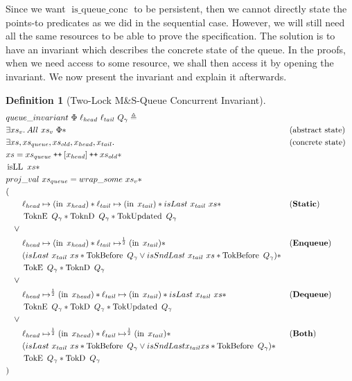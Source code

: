 \documentclass[a4paper, 11pt]{report}
\newtheorem{definition}{Definition}[section]
\newcommand{\tlmsq}{Two-Lock M\&S-Queue\xspace}
\newcommand{\isqueueconc}{\operatorname{is\_queue\_conc}}
\newcommand{\isLL}{\operatorname{isLL}}
\newcommand{\nIn}[1]{\operatorname{in} \; #1}
\newcommand{\StaticState}{\textbf{Static}}
\newcommand{\EnqueueState}{\textbf{Enqueue}}
\newcommand{\DequeueState}{\textbf{Dequeue}}
\newcommand{\BothState}{\textbf{Both}}
\newcommand{\Qg}{Q_\gname}
\newcommand{\TokE}[1]{\operatorname{TokE}\ #1}
\newcommand{\TokEQg}{\TokE{\Qg}}
\newcommand{\ToknE}[1]{\operatorname{ToknE}\ #1}
\newcommand{\ToknEQg}{\ToknE{\Qg}}
\newcommand{\TokD}[1]{\operatorname{TokD}\ #1}
\newcommand{\TokDQg}{\TokD{\Qg}}
\newcommand{\ToknD}[1]{\operatorname{ToknD}\ #1}
\newcommand{\ToknDQg}{\ToknD{\Qg}}
\newcommand{\TokBefore}[1]{\operatorname{TokBefore}\ #1}
\newcommand{\TokBeforeQg}{\TokBefore{\Qg}}
\newcommand{\TokAfterQg}{\TokBefore{\Qg}}
\newcommand{\TokUpdated}[1]{\operatorname{TokUpdated}\ #1}
\newcommand{\TokUpdatedQg}{\TokUpdated{\Qg}}
\newcommand\catenate{\mathbin{\text{\ttfamily\upshape ++}}}
\begin{document}
Since we want $\isqueueconc$ to be persistent, then we cannot directly state the points-to predicates as we did in the sequential case. However, we will still need all the same resources to be able to prove the specification. The solution is to have an invariant which describes the concrete state of the queue. In the proofs, when we need access to some resource, we shall then access it by opening the invariant. We now present the invariant and explain it afterwards.
\begin{definition}[\tlmsq Concurrent Invariant]\label{TLMSQ:spec:invariant}
  \begin{align*}
    &queue\_invariant \ \Phi \ \loc_{head} \ \loc_{tail} \ Q_\gname \eqdef\\
    &\Exists xs_v. All \ xs_v \ \Phi \star &&\text{(abstract state)}\\
    &\Exists xs, xs_{queue}, xs_{old}, x_{head}, x_{tail} . &&\text{(concrete state)}\\
    &xs = xs_{queue} \catenate [x_{head}] \catenate xs_{old} \star\\
    &\isLL \ xs \star\\
    &proj\_val \ xs_{queue} = wrap\_some \ xs_v \star\\
    &(\\
    &\quad\quad\loc_{head} \mapsto (\nIn{x_{head}}) \star \loc_{tail} \mapsto (\nIn{x_{tail}}) \star isLast \ x_{tail} \ xs \star &&\text{(\StaticState)}\\
    &\quad\quad \ToknEQg \star \ToknDQg \star \TokUpdatedQg\\
    &\quad\lor\\
    &\quad\quad\loc_{head} \mapsto (\nIn{x_{head}}) \star \loc_{tail} \mapsto^{\frac{1}{2}} (\nIn{x_{tail}}) \star &&\text{(\EnqueueState)}\\
    &\quad\quad (isLast \ x_{tail} \ xs \star \TokBeforeQg \lor isSndLast \ x_{tail} \ xs \star \TokAfterQg) \star\\
    &\quad\quad \TokEQg \star \ToknDQg\\
    &\quad\lor\\
    &\quad\quad\loc_{head} \mapsto^{\frac{1}{2}} (\nIn{x_{head}}) \star \loc_{tail} \mapsto (\nIn{x_{tail}}) \star isLast \ x_{tail} \ xs \star &&\text{(\DequeueState)}\\
    &\quad\quad \ToknEQg \star \TokDQg \star \TokUpdatedQg\\
    &\quad\lor\\
    &\quad\quad\loc_{head} \mapsto^{\frac{1}{2}} (\nIn{x_{head}}) \star \loc_{tail} \mapsto^{\frac{1}{2}} (\nIn{x_{tail}}) \star &&\text{(\BothState)}\\
    &\quad\quad (isLast \ x_{tail} \ xs \star \TokBeforeQg \lor isSndLast x_{tail} xs \star \TokAfterQg) \star\\
    &\quad\quad \TokEQg \star \TokDQg\\
    &)
  \end{align*}
\end{definition}
\end{document}
